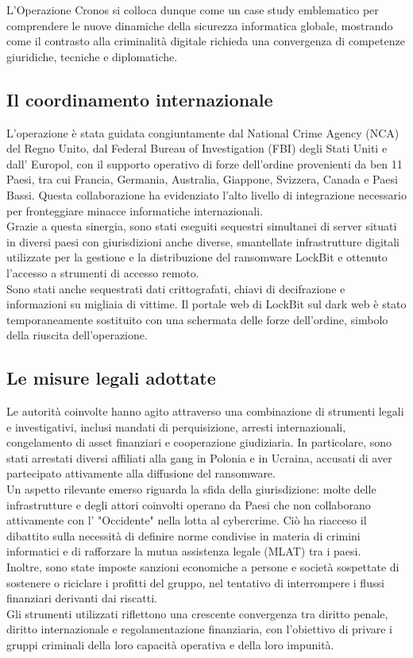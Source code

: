\documentclass[a4paper,12pt]{article}
\begin{document}
L'Operazione Cronos si colloca dunque come un case study emblematico per comprendere le nuove dinamiche della sicurezza informatica globale, mostrando come il contrasto alla criminalità digitale richieda una convergenza di competenze giuridiche, tecniche e diplomatiche.

\subsection{Il coordinamento internazionale}
L'operazione è stata guidata congiuntamente dal National Crime Agency (NCA) del Regno Unito, dal Federal Bureau of Investigation (FBI) degli Stati Uniti e dall' Europol, con il supporto operativo di forze dell'ordine provenienti da ben 11 Paesi, tra cui Francia, Germania, Australia, Giappone, Svizzera, Canada e Paesi Bassi. Questa collaborazione ha evidenziato l'alto livello di integrazione necessario per fronteggiare minacce informatiche internazionali.\\
Grazie a questa sinergia, sono stati eseguiti sequestri simultanei di server situati in diversi paesi con giurisdizioni anche diverse, smantellate infrastrutture digitali utilizzate per la gestione e la distribuzione del ransomware LockBit e ottenuto l'accesso a strumenti di accesso remoto. \\
Sono stati anche sequestrati dati crittografati, chiavi di decifrazione e informazioni su migliaia di vittime. Il portale web di LockBit sul dark web è stato temporaneamente sostituito con una schermata delle forze dell'ordine, simbolo della riuscita dell'operazione.

\subsection{Le misure legali adottate}
Le autorità coinvolte hanno agito attraverso una combinazione di strumenti legali e investigativi, inclusi mandati di perquisizione, arresti internazionali, congelamento di asset finanziari e cooperazione giudiziaria. In particolare, sono stati arrestati diversi affiliati alla gang in Polonia e in Ucraina, accusati di aver partecipato attivamente alla diffusione del ransomware.\\
Un aspetto rilevante emerso riguarda la sfida della giurisdizione: molte delle infrastrutture e degli attori coinvolti operano da Paesi che non collaborano attivamente con l' "Occidente" nella lotta al cybercrime. Ciò ha riacceso il dibattito sulla necessità di definire norme condivise in materia di crimini informatici e di rafforzare la mutua assistenza legale (MLAT) tra i paesi.\\
Inoltre, sono state imposte sanzioni economiche a persone e società sospettate di sostenere o riciclare i profitti del gruppo, nel tentativo di interrompere i flussi finanziari derivanti dai riscatti.\\
Gli strumenti utilizzati riflettono una crescente convergenza tra diritto penale, diritto internazionale e regolamentazione finanziaria, con l'obiettivo di privare i gruppi criminali della loro capacità operativa e della loro impunità.
\end{document}
